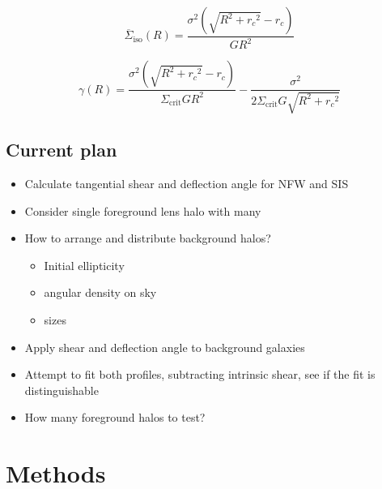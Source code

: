 \documentclass[]{article}
\begin{document}
\begin{equation}
    \overline{\Sigma}_\mathrm{iso}(R) = \frac{\sigma^2 \left(\sqrt{R^2 + {r_c}^2} - r_c \right)}{G R^2}
\end{equation}

\begin{equation}
    \gamma(R) = \frac{\sigma^2 \left(\sqrt{R^2 + {r_c}^2} - r_c \right)}{\Sigma_\mathrm{crit} G R^2} - \frac{\sigma^2}{2 \Sigma_\mathrm{crit} G \sqrt{R^2 + {r_c}^2}}
\end{equation}




\subsection{Current plan}
\begin{itemize}
    \item Calculate tangential shear and deflection angle for NFW and SIS
    \item Consider single foreground lens halo with many
    \item How to arrange and distribute background halos?
    \begin{itemize}
        \item Initial ellipticity
        \item angular density on sky
        \item sizes
    \end{itemize}
    \item Apply shear and deflection angle to background galaxies
    \item Attempt to fit both profiles, subtracting intrinsic shear, see if the fit is distinguishable
    \item How many foreground halos to test?

\end{itemize}



\section{Methods}
\end{document}
